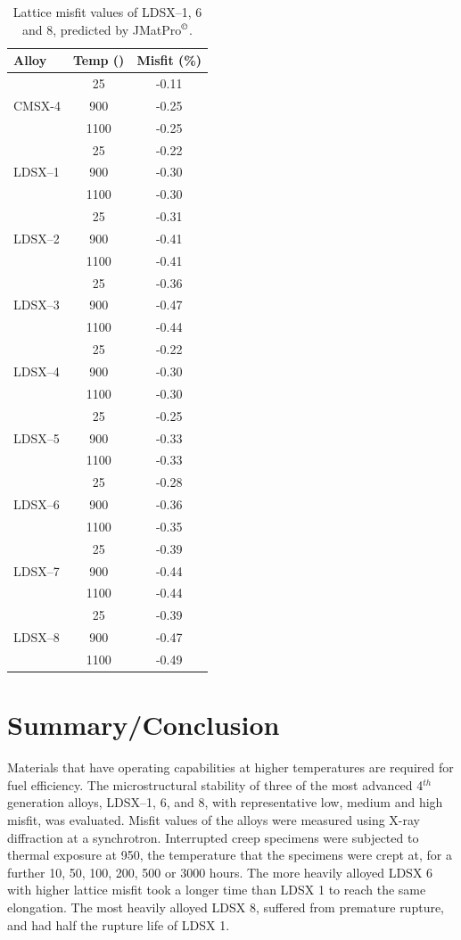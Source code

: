 \begin{table}[H]
\begin{center}
\begin{tabular}{l c c } 
\hline
\hline
Alloy&	Temp (\celsius) &	Misfit (\%)\\
\hline
&	25	&-0.11\\
CMSX-4	&900	&-0.25\\
	&1100&-0.25\\
	\hline
&	25	&-0.22\\
LDSX--1	&900	&-0.30\\
	&1100&	-0.30\\
	\hline
&	25	&-0.31\\
LDSX--2	&900	&-0.41\\
	&1100&	-0.41\\
	\hline
&	25&	-0.36\\
LDSX--3	&900&	-0.47\\
	&1100&	-0.44\\
	\hline
&	25	&-0.22\\
LDSX--4	&900	&-0.30\\
	&1100&	-0.30\\\hline
&	25&	-0.25\\
LDSX--5	&900	&-0.33\\
	&1100&	-0.33\\
	\hline
&	25&	-0.28\\
LDSX--6	&900	&-0.36\\
	&1100&	-0.35\\
	\hline
&	25&	-0.39\\
LDSX--7	&900	&-0.44\\
	&1100&	-0.44\\
	\hline
&	25&	-0.39\\
LDSX--8	&	900&	-0.47\\
	&	1100&	-0.49\\
\hline
\hline
\end{tabular}
\end{center}
\caption{Lattice misfit values of LDSX--1, 6 and 8, predicted by JMatPro$^{\copyright}$. }
\label{tab:misfitjmatpro}
\end{table}


\section{Summary/Conclusion}
Materials that have operating capabilities at higher temperatures are required for fuel efficiency.  The microstructural stability of three of the most advanced 4$^{th}$ generation alloys, LDSX--1, 6, and 8, with representative low, medium and high misfit, was evaluated. Misfit values of the alloys were measured using X-ray diffraction at a synchrotron.  Interrupted creep specimens were subjected to thermal exposure at 950\celsius, the temperature that the specimens were crept at, for a further 10, 50, 100, 200, 500 or 3000 hours.  The more heavily alloyed LDSX 6 with higher lattice misfit took a longer time than LDSX 1 to reach the same elongation.  The most heavily alloyed LDSX 8, suffered from premature rupture, and had half the rupture life of LDSX 1. 

